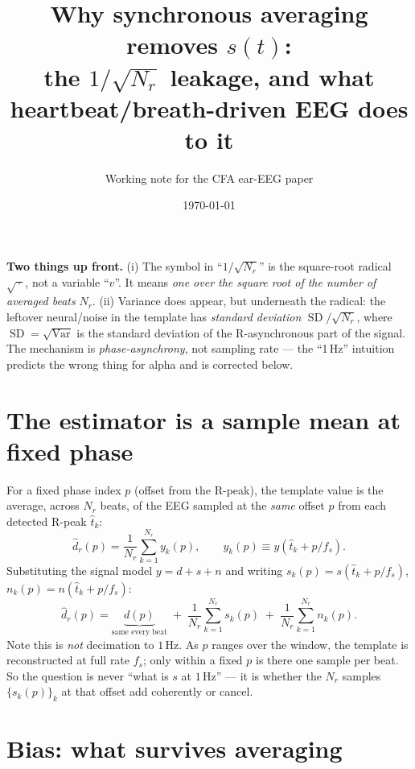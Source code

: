 \documentclass[11pt]{article}
\title{\vspace{-2em}\bfseries Why synchronous averaging removes $s(t)$:\\
the $1/\sqrt{N_r}$ leakage, and what heartbeat/breath-driven EEG does to it}
\author{Working note for the CFA ear-EEG paper}
\date{\today}
\newcommand{\Var}{\operatorname{Var}}
\newcommand{\SD}{\operatorname{SD}}
\newcommand{\dhat}{\widehat{d}}
\begin{document}
\maketitle
\vspace{-1.5em}

\noindent
\textbf{Two things up front.}
(i) The symbol in ``$1/\sqrt{N_r}$'' is the square-root radical $\sqrt{\,\cdot\,}$, not a
variable ``$v$''. It means \emph{one over the square root of the number of averaged beats}
$N_r$. (ii) Variance does appear, but underneath the radical: the leftover neural/noise in the
template has \emph{standard deviation} $\SD/\sqrt{N_r}$, where $\SD=\sqrt{\Var}$ is the standard
deviation of the R-asynchronous part of the signal. The mechanism is \emph{phase-asynchrony},
not sampling rate --- the ``1\,Hz'' intuition predicts the wrong thing for alpha and is corrected
below.

\section{The estimator is a sample mean at fixed phase}

For a fixed phase index $p$ (offset from the R-peak), the template value is the average, across
$N_r$ beats, of the EEG sampled at the \emph{same} offset $p$ from each detected R-peak
$\widehat t_k$:
\begin{equation}
\dhat_r(p) = \frac{1}{N_r}\sum_{k=1}^{N_r} y_k(p),
\qquad
y_k(p) \equiv y\!\left(\widehat t_k + p/f_s\right).
\label{eq:est}
\end{equation}
Substituting the signal model $y=d+s+n$ and writing
$s_k(p)=s(\widehat t_k+p/f_s)$, $n_k(p)=n(\widehat t_k+p/f_s)$:
\begin{equation}
\dhat_r(p) = \underbrace{d(p)}_{\text{same every beat}}
\;+\; \frac{1}{N_r}\sum_{k=1}^{N_r} s_k(p)
\;+\; \frac{1}{N_r}\sum_{k=1}^{N_r} n_k(p).
\label{eq:decomp}
\end{equation}
Note this is \emph{not} decimation to $1$\,Hz. As $p$ ranges over the window, the template is
reconstructed at full rate $f_s$; only within a fixed $p$ is there one sample per beat. So the
question is never ``what is $s$ at $1$\,Hz'' --- it is whether the $N_r$ samples
$\{s_k(p)\}_k$ at that offset add coherently or cancel.

\section{Bias: what survives averaging}
\end{document}
